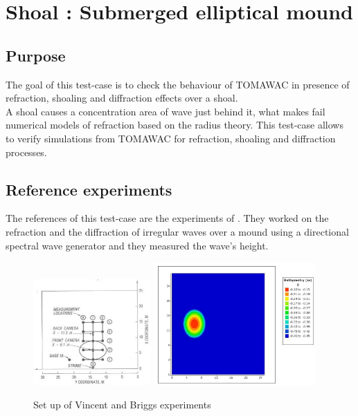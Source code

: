 \section{Shoal : Submerged elliptical mound}
%

%
\subsection{Purpose}
The goal of this test-case is to check the behaviour of TOMAWAC in presence of refraction, shoaling and diffraction effects over a shoal.\\
A shoal causes a concentration area of wave just behind it, what makes fail numerical models of refraction based on the radius theory. This test-case allows to verify simulations from TOMAWAC for refraction, shoaling and diffraction processes.

\subsection{Reference experiments}
The references of this test-case are the experiments of \cite{Vincent1989}. They worked on the refraction and the diffraction of irregular waves over a mound using a directional spectral wave generator and they measured the wave's height.\\

\begin{figure}[h!]
\label{shoalsetup}
  \centering
    \includegraphics[width=0.4\textwidth]{setup.jpg}
      \includegraphics[width=0.55\textwidth]{bathy_shoal.jpg}
      \caption{Set up of Vincent and Briggs experiments}
\end{figure}

